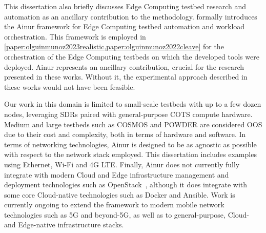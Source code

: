 \bigskip

This dissertation also briefly discusses Edge Computing testbed research and automation as an ancillary contribution to the methodology.
 formally introduces the Ainur framework for Edge Computing testbed automation and workload orchestration.
This framework is employed in \cref{paper:olguinmunoz2023realistic,paper:olguinmunoz2022cleave} for the orchestration of the Edge Computing testbeds on which the developed tools were deployed.
Ainur represents an ancillary contribution, crucial for the research presented in these works.
Without it, the experimental approach described in these works would not have been feasible.

Our work in this domain is limited to small-scale testbeds with up to a few dozen nodes, leveraging \glspl{SDR} paired with general-purpose \gls{COTS} compute hardware.
Medium and large testbeds such as \gls{COSMOS} and \gls{POWDER} are considered \gls{OOS} due to their cost and complexity, both in terms of hardware and software.
In terms of networking technologies, Ainur is designed to be as agnostic as possible with respect to the network stack employed.
This dissertation includes examples using Ethernet, Wi-Fi and 4G \gls{LTE}.
Finally, Ainur does not currently fully integrate with modern Cloud and Edge infrastructure management and deployment technologies such as OpenStack~\cite{openstack}, although it does integrate with some core Cloud-native technologies such as Docker and Ansible.
Work is currently ongoing to extend the framework to modern mobile network technologies such as 5G and beyond-5G, as well as to general-purpose, Cloud- and Edge-native infrastructure stacks.





